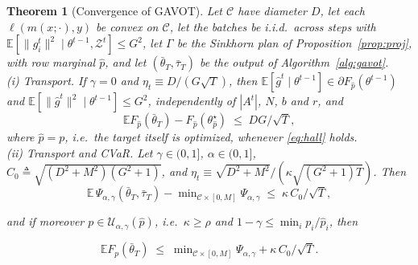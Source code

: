 \documentclass{article}
\newtheorem{theorem}{Theorem}
\theoremstyle{definition}
\newcommand{\E}{\mathbb{E}}
\newcommand{\Uset}{\mathcal{U}_{\alpha,\gamma}}
\newcommand{\avot}{\textsf{GAVOT}}
\begin{document}
\vspace{-4pt}
\begin{theorem}[Convergence of \avot{}]
\label{thm:rate}
Let $\mathcal{C}$ have diameter $D$, let each $\ell(m(x;\cdot),y)$ be
convex on $\mathcal{C}$, let the batches be i.i.d.\ across steps with
$\E[\|g^t_i\|^2\mid\theta^{t-1},\mathcal{Z}^t]\le G^2$, let $\Gamma$ be the
Sinkhorn plan of Proposition~\ref{prop:proj}, with row marginal $\hat p$,
and let $(\bar\theta_T,\bar\tau_T)$ be the output of
Algorithm~\ref{alg:gavot}.\\
(i) \emph{Transport.} If $\gamma=0$ and $\eta_t\equiv D/(G\sqrt{T})$, then
$\E[\hat g^t\mid\theta^{t-1}]\in\partial F_{\hat p}(\theta^{t-1})$ and
$\E[\|\hat g^t\|^2\mid\theta^{t-1}]\le G^2$, independently of $|A^t|$,
$N$, $b$ and $r$, and
\begin{equation}
\E F_{\hat p}(\bar\theta_T)-F_{\hat p}(\theta^\star_{\hat p})\;\le\;DG/\sqrt{T},
\label{eq:rate}
\end{equation}
where $\hat p=p$, i.e.\ the target itself is optimized, whenever
\eqref{eq:hall} holds.\\
(ii) \emph{Transport and CVaR.} Let $\gamma\in(0,1]$, $\alpha\in(0,1]$,
$C_0\triangleq\sqrt{(D^2+M^2)(G^2+1)}$, and
$\eta_t\equiv\sqrt{D^2+M^2}/(\kappa\sqrt{(G^2+1)T})$. Then
\vspace{-12pt}
\begin{equation*}
\E\,\Psi_{\alpha,\gamma}(\bar\theta_T,\bar\tau_T)
-\min\nolimits_{\mathcal{C}\times[0,M]}\Psi_{\alpha,\gamma}\;\le\;\kappa\,C_0/\sqrt T,
\end{equation*}\vspace{-8pt}
\vspace{-8pt}

and if moreover $p\in\Uset(\hat p)$, i.e.\ $\kappa\ge\rho$ and
$1-\gamma\le\min_ip_i/\hat p_i$, then\vspace{-8pt}

\begin{equation}
\E F_p(\bar\theta_T)\;\le\;\min\nolimits_{\mathcal{C}\times[0,M]}\Psi_{\alpha,\gamma}
+\kappa\,C_0/\sqrt{T}.
\label{eq:certificate}
\end{equation}\vspace{-8pt}

\end{theorem}\vspace{-12pt}
\end{document}
